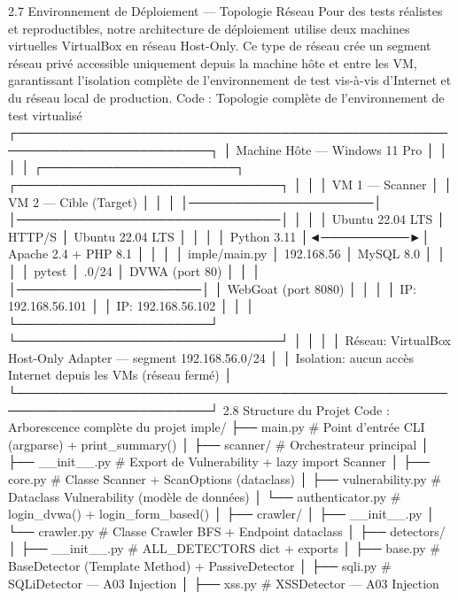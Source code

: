 2.7  Environnement de Déploiement — Topologie Réseau
Pour des tests réalistes et reproductibles, notre architecture de déploiement utilise deux machines virtuelles VirtualBox en réseau Host-Only. Ce type de réseau crée un segment réseau privé accessible uniquement depuis la machine hôte et entre les VM, garantissant l'isolation complète de l'environnement de test vis-à-vis d'Internet et du réseau local de production.
Code : Topologie complète de l'environnement de test virtualisé
┌────────────────────────────────────────────────────────────────────────┐
│                    Machine Hôte — Windows 11 Pro                       │
│                                                                        │
│  ┌──────────────────────┐            ┌──────────────────────────────┐  │
│  │  VM 1 — Scanner      │            │  VM 2 — Cible (Target)       │  │
│  │─────────────────────│            │──────────────────────────────│  │
│  │  Ubuntu 22.04 LTS    │   HTTP/S   │  Ubuntu 22.04 LTS            │  │
│  │  Python 3.11         │◄──────────►│  Apache 2.4 + PHP 8.1        │  │
│  │  imple/main.py       │ 192.168.56 │  MySQL 8.0                   │  │
│  │  pytest              │   .0/24    │  DVWA (port 80)              │  │
│  │─────────────────────│            │  WebGoat (port 8080)         │  │
│  │  IP: 192.168.56.101  │            │  IP: 192.168.56.102          │  │
│  └──────────────────────┘            └──────────────────────────────┘  │
│                                                                        │
│  Réseau: VirtualBox Host-Only Adapter — segment 192.168.56.0/24        │
│  Isolation: aucun accès Internet depuis les VMs (réseau fermé)         │
└────────────────────────────────────────────────────────────────────────┘
2.8  Structure du Projet
Code : Arborescence complète du projet
imple/
├── main.py                  # Point d'entrée CLI (argparse) + print_summary()
│
├── scanner/                 # Orchestrateur principal
│   ├── __init__.py          # Export de Vulnerability + lazy import Scanner
│   ├── core.py              # Classe Scanner + ScanOptions (dataclass)
│   ├── vulnerability.py     # Dataclass Vulnerability (modèle de données)
│   └── authenticator.py    # login_dvwa() + login_form_based()
│
├── crawler/
│   ├── __init__.py
│   └── crawler.py           # Classe Crawler BFS + Endpoint dataclass
│
├── detectors/
│   ├── __init__.py          # ALL_DETECTORS dict + exports
│   ├── base.py              # BaseDetector (Template Method) + PassiveDetector
│   ├── sqli.py              # SQLiDetector  — A03 Injection
│   ├── xss.py               # XSSDetector   — A03 Injection

